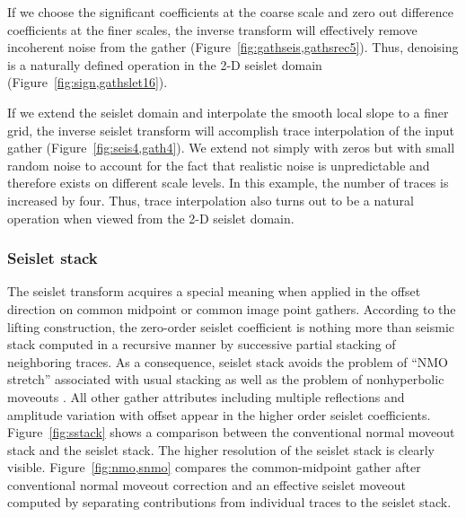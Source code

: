 If we choose the significant coefficients at the coarse scale and
zero out difference coefficients at the finer scales, the inverse
transform will effectively remove incoherent noise from the gather
(Figure~\ref{fig:gathseis,gathsrec5}). Thus, denoising is a naturally
defined operation in the 2-D seislet domain
(Figure~\ref{fig:sign,gathslet16}).

If we extend the seislet  domain and interpolate the
smooth local slope to a finer grid, the inverse seislet transform will
accomplish trace interpolation of the input gather
(Figure~\ref{fig:seis4,gath4}). {We extend not simply with zeros but
with small random noise to account for the fact that realistic noise
is unpredictable and therefore exists on different scale levels.}  In
this example, the number of traces is increased by four. Thus, trace
interpolation also turns out to be a natural operation when viewed
from the 2-D seislet domain.


\subsubsection{Seislet stack}

The seislet transform acquires a special meaning when applied in the
offset direction on common midpoint or common image point
gathers. According to the lifting construction, the zero-order seislet
coefficient is nothing more than seismic stack computed in a recursive
manner by successive partial stacking of neighboring traces. As a
consequence, seislet stack avoids the problem of ``NMO stretch''
associated with usual stacking \cite[]{nmo} as well as the problem of
nonhyperbolic moveouts \cite{grechka}. All other gather attributes
including multiple reflections and amplitude variation with offset
appear in the higher order seislet coefficients.
Figure~\ref{fig:sstack} shows a comparison between the conventional
normal moveout stack and the seislet stack. The higher resolution of
the seislet stack is clearly visible. Figure~\ref{fig:nmo,snmo}
compares the common-midpoint gather after conventional normal moveout
correction and an effective seislet moveout computed by separating
contributions from individual traces to the seislet stack.
  
